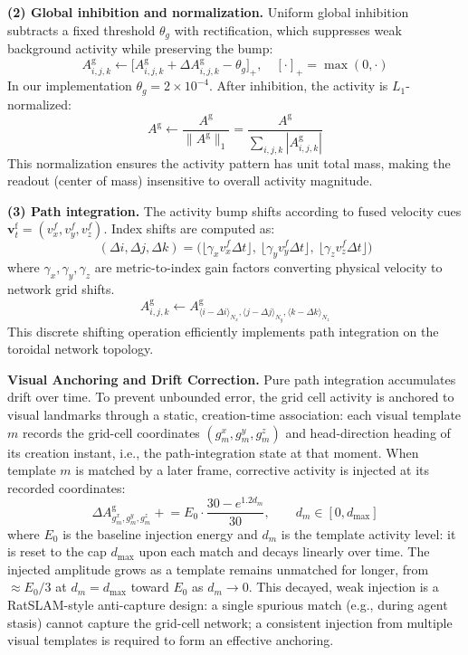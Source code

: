 \textbf{(2) Global inhibition and normalization.} Uniform global inhibition subtracts a fixed threshold $\theta_g$ with rectification, which suppresses weak background activity while preserving the bump:
\begin{equation}
    A^\mathrm{g}_{i,j,k}\leftarrow \big[A^\mathrm{g}_{i,j,k}+\Delta A^\mathrm{g}_{i,j,k}-\theta_g\big]_+,\quad [\cdot]_+ = \max(0, \cdot)
\end{equation}
In our implementation $\theta_g = 2\times10^{-4}$. After inhibition, the activity is $L_1$-normalized:
\begin{equation}
    A^\mathrm{g}\leftarrow \frac{A^\mathrm{g}}{\lVert A^\mathrm{g}\rVert_1}=\frac{A^\mathrm{g}}{\sum_{i,j,k}|A^\mathrm{g}_{i,j,k}|}
\end{equation}
This normalization ensures the activity pattern has unit total mass, making the readout (center of mass) insensitive to overall activity magnitude.

\textbf{(3) Path integration.} The activity bump shifts according to fused velocity cues $\mathbf{v}^\mathrm{f}_t = (v^f_x, v^f_y, v^f_z)$. Index shifts are computed as:
\begin{equation}
    (\Delta i,\Delta j,\Delta k)=\big(\lfloor \gamma_x v^f_x\Delta t\rfloor,\ \lfloor \gamma_y v^f_y\Delta t\rfloor,\ \lfloor \gamma_z v^f_z\Delta t\rfloor\big)
\end{equation}
where $\gamma_x,\gamma_y,\gamma_z$ are metric-to-index gain factors converting physical velocity to network grid shifts.
\begin{equation}
    A^\mathrm{g}_{i,j,k}\leftarrow A^\mathrm{g}_{\langle i-\Delta i\rangle_{N_x},\langle j-\Delta j\rangle_{N_y},\langle k-\Delta k\rangle_{N_z}}
\end{equation}
This discrete shifting operation efficiently implements path integration on the toroidal network topology.

\textbf{Visual Anchoring and Drift Correction.} Pure path integration accumulates drift over time. To prevent unbounded error, the grid cell activity is anchored to visual landmarks through a static, creation-time association: each visual template $m$ records the grid-cell coordinates $(g^x_m,g^y_m,g^z_m)$ and head-direction heading of its creation instant, i.e., the path-integration state at that moment. When template $m$ is matched by a later frame, corrective activity is injected at its recorded coordinates:
\begin{equation}
    \Delta A^\mathrm{g}_{g^x_m,g^y_m,g^z_m} \mathrel{+}= E_0\cdot\frac{30-e^{1.2 d_m}}{30},\qquad d_m\in[0,d_{\max}]
\end{equation}
where $E_0$ is the baseline injection energy and $d_m$ is the template activity level: it is reset to the cap $d_{\max}$ upon each match and decays linearly over time. The injected amplitude grows as a template remains unmatched for longer, from $\approx E_0/3$ at $d_m=d_{\max}$ toward $E_0$ as $d_m\to 0$. This decayed, weak injection is a RatSLAM-style anti-capture design: a single spurious match (e.g., during agent stasis) cannot capture the grid-cell network; a consistent injection from multiple visual templates is required to form an effective anchoring.


